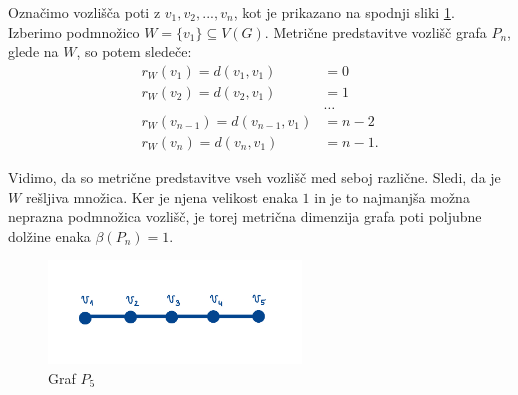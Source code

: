 \documentclass[mat1, tisk]{fmfdelo}
\newcommand{\1}{(1, 1, ..., 1)}
\newcommand{\2}{(2, 2, ..., 2)}
\begin{document}
\begin{primer} \label{pr:mdim_pot}
Označimo vozlišča poti z $v_1, v_2, ..., v_n$, kot je prikazano na spodnji sliki \ref{fig:pot}. 
Izberimo podmnožico $W = \{v_1\} \subseteq V(G).$ Metrične predstavitve vozlišč grafa $P_n$, 
glede na $W$, so potem sledeče:
\begin{align*}
    r_W(v_1) = d(v_1, v_1) & = 0 \\
    r_W(v_2) = d(v_2, v_1) & = 1 \\
    & \dots \\
    r_W(v_{n-1}) = d(v_{n-1}, v_1) & = n-2 \\
    r_W(v_n) = d(v_n, v_1) & = n-1.
\end{align*}

Vidimo, da so metrične predstavitve vseh vozlišč med seboj različne. Sledi, da je $W$ 
rešljiva množica. Ker je njena velikost enaka $1$ in je to najmanjša možna neprazna podmnožica 
vozlišč, je torej metrična dimenzija grafa poti poljubne dolžine enaka $\beta(P_n) = 1.$

\begin{figure}[h]
    \centering
    \includegraphics[width=0.6\textwidth]{IMG_pot.jpg}
    \caption{Graf $P_5$}
    \label{fig:pot}      
\end{figure}

\end{primer}
\end{document}
